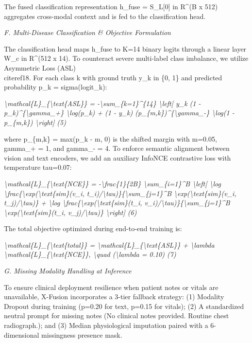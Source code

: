 \documentclass[
]{article}
\begin{document}
The fused classification representation h\_fuse = S\_L{[}0{]} in R\^{}(B
x 512) aggregates cross-modal context and is fed to the classification
head.

\emph{F. Multi-Disease Classification \& Objective Formulation}

The classification head maps h\_fuse to K=14 binary logits through a
linear layer W\_c in R\^{}(512 x 14). To counteract severe multi-label
class imbalance, we utilize Asymmetric Loss (ASL) \\cite{ref18}. For each
class k with ground truth y\_k in \{0, 1\} and predicted probability
p\_k = sigma(logit\_k):

\emph{\textbackslash mathcal\{L\}\_\{\textbackslash text\{ASL\}\} =
-\textbackslash sum\_\{k=1\}\^{}\{14\} \textbackslash left{[} y\_k (1 -
p\_k)\^{}\{\textbackslash gamma\_+\} \textbackslash log(p\_k) + (1 -
y\_k) (p\_\{m,k\})\^{}\{\textbackslash gamma\_-\} \textbackslash log(1 -
p\_\{m,k\}) \textbackslash right{]} (5)}

where p\_\{m,k\} = max(p\_k - m, 0) is the shifted margin with m=0.05,
gamma\_+ = 1, and gamma\_- = 4. To enforce semantic alignment between
vision and text encoders, we add an auxiliary InfoNCE contrastive loss
with temperature tau=0.07:

\emph{\textbackslash mathcal\{L\}\_\{\textbackslash text\{NCE\}\} =
-\textbackslash frac\{1\}\{2B\} \textbackslash sum\_\{i=1\}\^{}B
\textbackslash left{[} \textbackslash log
\textbackslash frac\{\textbackslash exp(\textbackslash text\{sim\}(v\_i,
t\_i)/\textbackslash tau)\}\{\textbackslash sum\_\{j=1\}\^{}B
\textbackslash exp(\textbackslash text\{sim\}(v\_i,
t\_j)/\textbackslash tau)\} + \textbackslash log
\textbackslash frac\{\textbackslash exp(\textbackslash text\{sim\}(t\_i,
v\_i)/\textbackslash tau)\}\{\textbackslash sum\_\{j=1\}\^{}B
\textbackslash exp(\textbackslash text\{sim\}(t\_i,
v\_j)/\textbackslash tau)\} \textbackslash right{]} (6)}

The total objective optimized during end-to-end training is:

\emph{\textbackslash mathcal\{L\}\_\{\textbackslash text\{total\}\} =
\textbackslash mathcal\{L\}\_\{\textbackslash text\{ASL\}\} +
\textbackslash lambda
\textbackslash mathcal\{L\}\_\{\textbackslash text\{NCE\}\},
\textbackslash quad (\textbackslash lambda = 0.10) (7)}

\emph{G. Missing Modality Handling at Inference}

To ensure clinical deployment resilience when patient notes or vitals
are unavailable, X-Fusion incorporates a 3-tier fallback strategy: (1)
Modality Dropout during training (p=0.20 for text, p=0.15 for vitals);
(2) A standardized neutral prompt for missing notes (\textquotesingle No
clinical notes provided. Routine chest radiograph.\textquotesingle); and
(3) Median physiological imputation paired with a 6-dimensional
missingness presence mask.
\end{document}
